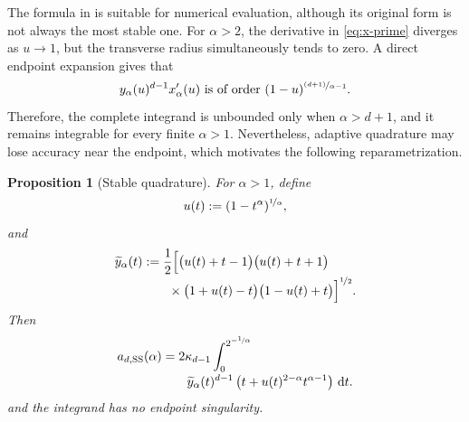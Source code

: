 \documentclass[a4paper,fleqn]{cas-dc}
\newtheorem{proposition}{Proposition}
\theoremstyle{definition}
\theoremstyle{remark}
\newcommand{\dd}{\,\mathrm{d}}
\newcommand{\0}{\mathbf{0}}
\begin{document}
The formula in  is suitable for numerical evaluation, although
its original form is not always the most stable one. For $\alpha>2$,
the derivative in \eqref{eq:x-prime} diverges as $u\to1$, but the transverse
radius simultaneously tends to zero. A direct endpoint expansion gives that
\begin{equation}
    y_\alpha(u)^{d-1}x_\alpha'(u)
    \text{ is of order }
     (1-u)^{\nicefrac{(d+1)}{\alpha-1}}.
\end{equation}
Therefore, the complete integrand is unbounded only when
$\alpha>d+1$, and it remains integrable for every finite $\alpha>1$.
Nevertheless, adaptive quadrature may lose accuracy near the endpoint,
which motivates the following reparametrization.

\begin{proposition}[Stable quadrature]\label{prop:stable-quadrature}
For $\alpha>1$, define
\begin{equation}
u(t):=(1-t^\alpha)^{\nicefrac{1}{\alpha}},
\end{equation}
and
\begin{equation}
\begin{aligned}
\widetilde y_\alpha(t)
&:=\frac12\Bigl[
\bigl(u(t)+t-1\bigr)
\bigl(u(t)+t+1\bigr)
\\[-0.2em]
&\qquad{}\times
\bigl(1+u(t)-t\bigr)
\bigl(1-u(t)+t\bigr)
\Bigr]^{\nicefrac12}.
\end{aligned}
\end{equation}
Then
\begin{equation}\label{eq:stable-ss-integral}
\begin{split}
a_{d,\mathrm{SS}}(\alpha)
&=
2\kappa_{d-1}
\int_0^{2^{-\nicefrac{1}{\alpha}}}
\\[-0.2em]
&\qquad
\widetilde y_\alpha(t)^{d-1}
\left(
t+u(t)^{2-\alpha}t^{\alpha-1}
\right)
\dd t.
\end{split}
\end{equation}
and the integrand has no endpoint singularity.
\end{proposition}
\end{document}
